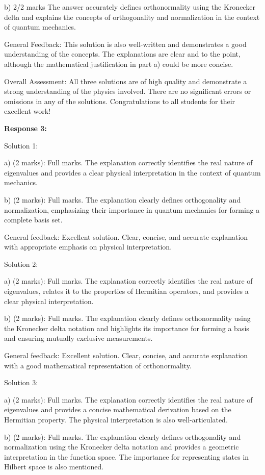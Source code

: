 \documentclass[a4paper,11pt]{article}
\begin{document}
b) 2/2 marks
The answer accurately defines orthonormality using the Kronecker delta and explains the concepts of orthogonality and normalization in the context of quantum mechanics.

General Feedback: This solution is also well-written and demonstrates a good understanding of the concepts. The explanations are clear and to the point, although the mathematical justification in part a) could be more concise.

Overall Assessment: All three solutions are of high quality and demonstrate a strong understanding of the physics involved. There are no significant errors or omissions in any of the solutions. Congratulations to all students for their excellent work!

\textbf{Response 3:}

Solution 1:

a) (2 marks): Full marks. The explanation correctly identifies the real nature of eigenvalues and provides a clear physical interpretation in the context of quantum mechanics.

b) (2 marks): Full marks. The explanation clearly defines orthogonality and normalization, emphasizing their importance in quantum mechanics for forming a complete basis set.

General feedback: Excellent solution. Clear, concise, and accurate explanation with appropriate emphasis on physical interpretation.

Solution 2:

a) (2 marks): Full marks. The explanation correctly identifies the real nature of eigenvalues, relates it to the properties of Hermitian operators, and provides a clear physical interpretation.

b) (2 marks): Full marks. The explanation clearly defines orthonormality using the Kronecker delta notation and highlights its importance for forming a basis and ensuring mutually exclusive measurements.

General feedback: Excellent solution. Clear, concise, and accurate explanation with a good mathematical representation of orthonormality.

Solution 3:

a) (2 marks): Full marks. The explanation correctly identifies the real nature of eigenvalues and provides a concise mathematical derivation based on the Hermitian property. The physical interpretation is also well-articulated.

b) (2 marks): Full marks. The explanation clearly defines orthogonality and normalization using the Kronecker delta notation and provides a geometric interpretation in the function space. The importance for representing states in Hilbert space is also mentioned.
\end{document}
